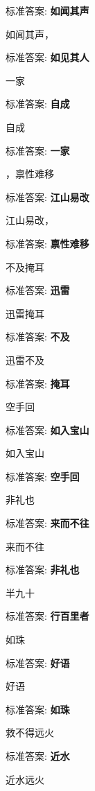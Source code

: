 \documentclass[12pt, a4paper, addpoints]{exam}
\begin{document}
\begin{multicols}{2}
\begin{questions}
标准答案: \textbf{如闻其声}

\question[1] 如闻其声，\uline{\qquad\qquad\qquad}

标准答案: \textbf{如见其人}

\question[1] \uline{\qquad\qquad\qquad}一家

标准答案: \textbf{自成}

\question[1] 自成\uline{\qquad\qquad\qquad}

标准答案: \textbf{一家}

\question[1] \uline{\qquad\qquad\qquad}，禀性难移

标准答案: \textbf{江山易改}

\question[1] 江山易改，\uline{\qquad\qquad\qquad}

标准答案: \textbf{禀性难移}

\question[1] \uline{\qquad\qquad\qquad}不及掩耳

标准答案: \textbf{迅雷}

\question[1] 迅雷\uline{\qquad\qquad\qquad}掩耳

标准答案: \textbf{不及}

\question[1] 迅雷不及\uline{\qquad\qquad\qquad}

标准答案: \textbf{掩耳}

\question[1] \uline{\qquad\qquad\qquad}空手回

标准答案: \textbf{如入宝山}

\question[1] 如入宝山\uline{\qquad\qquad\qquad}

标准答案: \textbf{空手回}

\question[1] \uline{\qquad\qquad\qquad}非礼也

标准答案: \textbf{来而不往}

\question[1] 来而不往\uline{\qquad\qquad\qquad}

标准答案: \textbf{非礼也}

\question[1] \uline{\qquad\qquad\qquad}半九十

标准答案: \textbf{行百里者}

\question[1] \uline{\qquad\qquad\qquad}如珠

标准答案: \textbf{好语}

\question[1] 好语\uline{\qquad\qquad\qquad}

标准答案: \textbf{如珠}

\question[1] \uline{\qquad\qquad\qquad}救不得远火

标准答案: \textbf{近水}

\question[1] 近水\uline{\qquad\qquad\qquad}远火


\end{questions}
\end{multicols}
\end{document}
